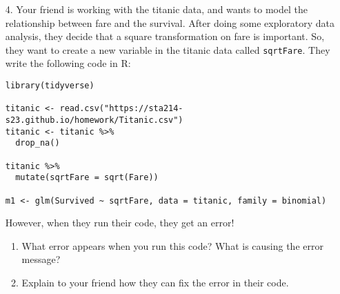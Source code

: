 \documentclass[11pt]{article}
\begin{document}
\begin{enumerate}
\item[4.] Your friend is working with the titanic data, and wants to model the relationship between fare and the survival. After doing some exploratory data analysis, they decide that a square transformation on fare is important. So, they want to create a new variable in the titanic data called \verb;sqrtFare;. They write the following code in R:

\begin{verbatim}
library(tidyverse)

titanic <- read.csv("https://sta214-s23.github.io/homework/Titanic.csv")
titanic <- titanic %>%
  drop_na()
  
titanic %>%
  mutate(sqrtFare = sqrt(Fare))
  
m1 <- glm(Survived ~ sqrtFare, data = titanic, family = binomial)
\end{verbatim}

However, when they run their code, they get an error!

\begin{enumerate}
\item What error appears when you run this code? What is causing the error message?

\item Explain to your friend how they can fix the error in their code.
\end{enumerate}

\end{enumerate}
\end{document}
